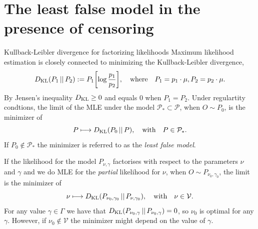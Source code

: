 \documentclass[smaller]{beamer}\usepackage{listings}
\begin{document}
\section{The least false model in the presence of censoring}
\label{sec:org66b8f05}
\begin{frame}[label={sec:orgb04cf6f}]{Kullback-Leibler divergence for factorizing likelihoods}
\small Maximum likelihood estimation is closely connected to minimizing the Kullback-Leibler
divergence,
\begin{equation*}
  D_{\mathrm{KL}}(P_1 \, || \, P_2) := P_1
  {\left[
    \log \frac{p_1}{p_2}
  \right]},
  \quad \text{where} \quad
  P_1 = p_1 \cdot \mu,   P_2 = p_2 \cdot \mu.
\end{equation*}
By Jensen's inequality \(D_{\mathrm{KL}} \geq 0\) and equals 0 when \(P_1=P_2\). Under regulartity condtions, the
limit of the MLE under the model \(\mathcal{P}_* \subset \mathcal{P}\), when \(O \sim P_0\), is the
minimizer of
\begin{equation*}
  P \longmapsto D_{\mathrm{KL}}(P_0 \, || \, P),
  \quad \text{with} \quad P \in \mathcal{P}_*.
\end{equation*}
If \(P_0 \not \in \mathcal{P}_*\) the minimizer is referred to as the \emph{least false model}.

\vfill

If the likelihood for the model \(P_{\nu, \gamma}\) factorises with respect to the parameters \(\nu\)
and \(\gamma\) and we do MLE for the \emph{partial} likelihood for \(\nu\), when \(O \sim P_{\nu_0,\gamma_0}\),
the limit is the minimizer of
\begin{equation*}
  \nu \longmapsto D_{\mathrm{KL}}(P_{\nu_0,\gamma_0} \, || \, P_{\nu,\gamma_0}),
  \quad \text{with} \quad \nu \in \mathcal{V}.
\end{equation*}
For any value \(\gamma \in \Gamma\) we have that \(D_{\mathrm{KL}}(P_{\nu_0,\gamma} \, || \, P_{\nu_0,\gamma}) =
0\), so \(\nu_0\) is optimal for any \(\gamma\). However, if \(\nu_0 \not \in \mathcal{V}\) the minimizer
might depend on the value of \(\gamma\).
\end{frame}
\end{document}
